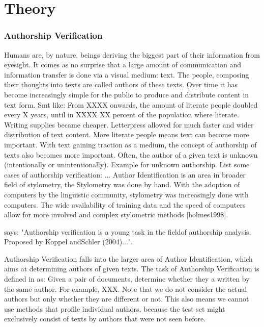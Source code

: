 \chapter{Theory}\label{theory}
\subsection{Authorship Verification}
Humans are, by nature, beings deriving the biggest part of their information from eyesight. It comes as no surprise that a large amount of communication and information transfer is done via a visual medium: text. The people, composing their thoughts into texts are called authors of these texts.
Over time it has become increasingly simple for the public to produce and distribute content in text form. Smt like: From XXXX onwards, the amount of literate people doubled every X years, until in XXXX XX percent of the population where literate. Writing supplies became cheaper. Letterpress allowed for much faster and wider distribution of text content. More literate people means text can become more important.
With text gaining traction as a medium, the concept of authorship of texts also becomes more important. Often, the author of a given text is unknown (intentionally or unintentionally). Example for unknown authorship.
List some cases of authorship verification: ... %
Author Identification is an area in broader field of stylometry, the
Stylometry was done by hand. With the adoption of computers by the linguistic community, stylometry was increasingly done with computers. The wide availability of training data and the speed of computers allow for more involved and complex stylometric methods [holmes1998].


\cite{stein2019unbiasedGutenbergCorpus} says: "Authorship verification is a young task in the fieldof authorship analysis.  Proposed by Koppel andSchler (2004)...".

Authorship Verification falls into the larger area of Author Identification, which aims at determining authors of given texts. The task of Authorship Verification is defined in \cite{bevendorff2020shared} as: Given a pair of documents, determine whether they a written by the same author. For example, XXX. Note that we do not consider the actual authors but only whether they are different or not. This also means we cannot use methods that profile individual authors, because the test set might exclusively consist of texts by authors that were not seen before.\\


